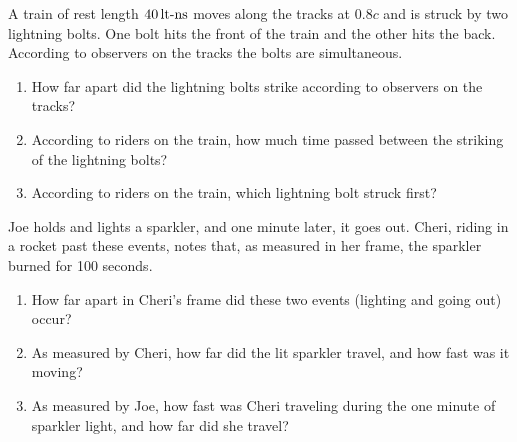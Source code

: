 \newpage

\begin{problem}
A train of rest length $40\,\mbox{lt-ns}$ moves along the
tracks at $0.8c$ and is struck by two lightning bolts.  One bolt hits
the front of the train and the other hits the back.  According to
observers  on the tracks the bolts are simultaneous.
\begin{enumerate}
\item How far apart did the lightning bolts strike according to 
observers on the tracks?  
\item According to riders on the train, how much time passed between the
striking of the lightning bolts?  
\item According to riders on the train, which lightning bolt 
struck first? 
\end{enumerate}
\end{problem}

\begin{problem}
Joe holds and lights a sparkler, and one minute later, it goes
out.  Cheri, riding in a rocket past these events, notes that, as
measured in her frame, the sparkler burned for 100 seconds.
\begin{enumerate}
\item How far apart in Cheri's frame did these two events (lighting
and going out) occur? 
\item As measured by Cheri, how far did the lit sparkler travel, and
how fast was it moving?  
\item As measured by Joe, how fast was Cheri traveling during the one
minute of sparkler light, and how far did she travel?
\end{enumerate}
\label{prob:sparkler}
\end{problem}

\newpage

